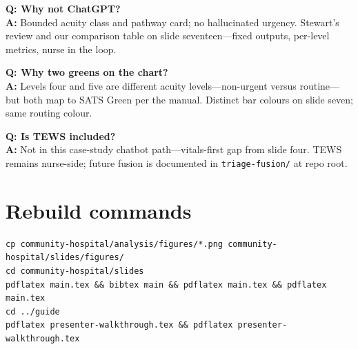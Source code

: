 \documentclass[11pt]{article}
\begin{document}
\begin{qabox}
\textbf{Q: Why not ChatGPT?}\\
\textbf{A:} Bounded acuity class and pathway card; no hallucinated urgency. Stewart's review and our
comparison table on slide seventeen---fixed outputs, per-level metrics, nurse in the loop.
\end{qabox}

\begin{qabox}
\textbf{Q: Why two greens on the chart?}\\
\textbf{A:} Levels four and five are different acuity levels---non-urgent versus routine---but both map
to SATS Green per the manual. Distinct bar colours on slide seven; same routing colour.
\end{qabox}

\begin{qabox}
\textbf{Q: Is TEWS included?}\\
\textbf{A:} Not in this case-study chatbot path---vitals-first gap from slide four. TEWS remains nurse-side;
future fusion is documented in \texttt{triage-fusion/} at repo root.
\end{qabox}

\section{Rebuild commands}

\begin{verbatim}
cp community-hospital/analysis/figures/*.png community-hospital/slides/figures/
cd community-hospital/slides
pdflatex main.tex && bibtex main && pdflatex main.tex && pdflatex main.tex
cd ../guide
pdflatex presenter-walkthrough.tex && pdflatex presenter-walkthrough.tex
\end{verbatim}
\end{document}
